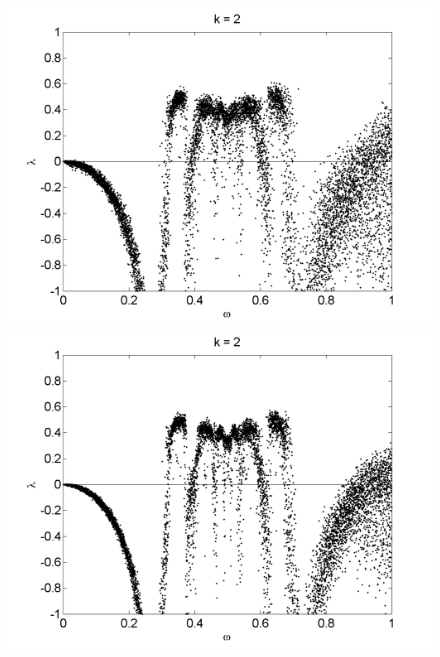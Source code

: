 \begin{figure}[!h]
\includegraphics[width=.5\textwidth]{figs/rcirc_u_lyap_10000_L_05_k_2_w.png}\hfill
\includegraphics[width=.5\textwidth]{figs/rcirc_u_lyap_10000_L_09_k_2_w.png}\\
\end{figure}

